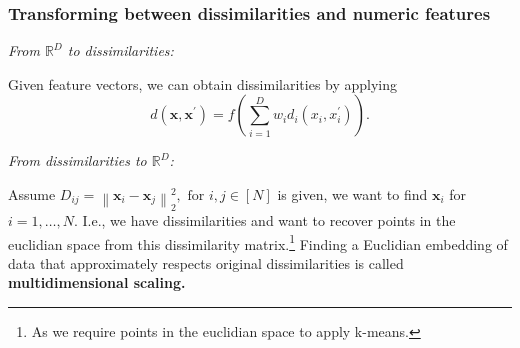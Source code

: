 \documentclass[11pt, %
	oneside, %
	english, %
	onehalfspacing, %
	parskip, %
	]{article} %
\theoremstyle{definition}
\begin{document}
\subsubsection*{Transforming between dissimilarities and numeric features}

\noindent\emph{From $\mathbb{R}^D$ to dissimilarities:}

Given feature vectors, we can obtain dissimilarities by applying
\begin{equation*}
	d\left(\mathbf{x}, \mathbf{x}^{\prime}\right)=f\left(\sum_{i=1}^D w_i d_i\left(x_i, x_i^{\prime}\right)\right).
\end{equation*}


\noindent\emph{From dissimilarities to $\mathbb{R}^D$:}

Assume $D_{i j}=\left\|\mathbf{x}_i-\mathbf{x}_j\right\|_2^2, \text { for } i, j \in[N]$ is given, we want to find $\mathbf{x}_i$ for $i =1, \dots, N$. I.e., we have dissimilarities and want to recover points in the euclidian space from this dissimilarity matrix.\footnote{As we require points in the euclidian space to apply k-means.} Finding a Euclidian embedding of data that approximately respects original dissimilarities is called \textbf{multidimensional scaling.}
\end{document}

